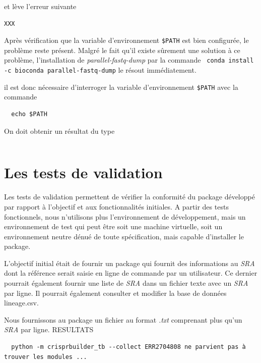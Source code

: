 \documentclass[twoside,a4paper,11pt,frenchb,openany]{report}
\begin{document}
et lève l'erreur suivante

\begin{verbatim}
XXX
\end{verbatim}

Après vérification que la variable d'environnement \texttt{\$PATH} est bien configurée, le problème reste présent. Malgré le fait qu'il existe sûrement une solution à ce problème, l'installation de \textit{parallel-fastq-dump} par la commande \texttt{  conda install -c bioconda parallel-fastq-dump} le résout immédiatement. 

il est donc nécessaire d'interroger la variable d'environnement \texttt{\$PATH} avec la commande

\begin{verbatim}
  echo $PATH
\end{verbatim}

On doit obtenir un résultat du type
\begin{verbatim}

\end{verbatim}



\section{Les tests de validation}

Les tests de validation permettent de vérifier la conformité du package développé par rapport à l'objectif et aux fonctionnalités initiales. A partir des tests fonctionnels, nous n'utilisons plus l'environnement de développement, mais un environnement de test qui peut être soit une machine virtuelle, soit un environnement neutre dénué de toute spécification, mais capable d'installer le package.

L'objectif initial était de fournir un package qui fournit des informations au \textit{SRA} dont la référence serait saisie en ligne de commande par un utilisateur. Ce dernier pourrait également fournir une liste de \textit{SRA} dans un fichier texte avec un \textit{SRA} par ligne. Il pourrait également consulter et modifier la base de données lineage.csv.

Nous fournissons au package un fichier au format \textit{.txt} comprenant plus qu'un \textit{SRA} par ligne. RESULTATS  

\begin{verbatim}
  python -m crisprbuilder_tb --collect ERR2704808 ne parvient pas à trouver les modules ...
\end{verbatim}
\end{document}

